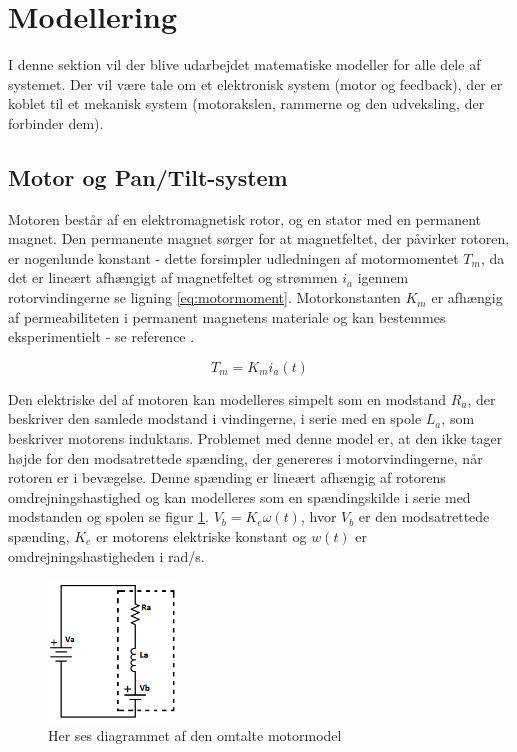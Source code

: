 \section{Modellering}\label{section:Modellering}
I denne sektion vil der blive udarbejdet matematiske modeller for alle dele af systemet. Der vil være tale om et elektronisk system (motor og feedback), der er koblet til et mekanisk system (motorakslen, rammerne og den udveksling, der forbinder dem). 

\subsection{Motor og Pan/Tilt-system}
Motoren består af en elektromagnetisk rotor, og en stator med en permanent magnet. Den permanente magnet sørger for at magnetfeltet, der påvirker rotoren, er nogenlunde konstant - dette forsimpler udledningen af motormomentet $T_{m}$, da det er lineært afhængigt af magnetfeltet og strømmen $i_{a}$ igennem rotorvindingerne se ligning \ref{eq:motormoment}. Motorkonstanten $K_{m}$ er afhængig af permeabiliteten i permanent magnetens materiale og kan bestemmes eksperimentielt - se reference \cite{azevedo2013}.

\begin{equation}\label{eq:motormoment}
T_{m}=K_{m}i_{a}(t)
\end{equation}

Den elektriske del af motoren kan modelleres simpelt som en modstand $R_{a}$, der beskriver den samlede modstand i vindingerne, i serie med en spole $L_{a}$, som beskriver motorens induktans. Problemet med denne model er, at den ikke tager højde for den modsatrettede spænding, der genereres i motorvindingerne, når rotoren er i bevægelse. Denne spænding er lineært afhængig af rotorens omdrejningshastighed og kan modelleres som en spændingskilde i serie med modstanden og spolen se figur \ref{fig:motor_sch}. $V_{b}=K_{e}\omega(t)$, hvor $V_{b}$ er den modsatrettede spænding, $K_{e}$ er motorens elektriske konstant og $w(t)$ er omdrejningshastigheden i rad/s.\\



\begin{figure}
	\centering
	\includegraphics[width=0.3\textwidth]{Billeder/Motormodel.png}
	\caption{Her ses diagrammet af den omtalte motormodel}
	\label{fig:motor_sch}
\end{figure}

